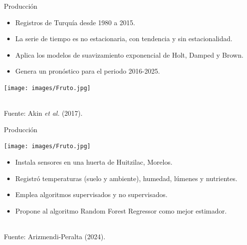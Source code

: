 \documentclass[aspectratio=169]{beamer}
\begin{document}
\begin{frame}{Producción}
    
    \vspace{-1cm}
		\begin{minipage}{0.5\textwidth}
            \begin{block}{}
                \begin{itemize}
				\item Registros de Turquía desde 1980 a 2015.
                    \item La serie de tiempo es no estacionaria, con tendencia y sin estacionalidad.
                    \item Aplica los modelos de suavizamiento exponencial de Holt, Damped y Brown.
                    \item Genera un pronóstico para el periodo 2016-2025. 
			\end{itemize}
            \end{block}
		\end{minipage}%
        \begin{minipage}{0.5\textwidth}
        \centering
\texttt{[image: images/Fruto.jpg]}
		\end{minipage}%
        \,\\
        \hfill {\scriptsize Fuente: Akin \textit{et al.} (2017).}
\end{frame}

\begin{frame}{Producción}
    \vspace{-1cm}
    \begin{minipage}{0.5\textwidth}
			\hspace{-0.5cm}
            \centering
            \texttt{[image: images/Fruto.jpg]}
		\end{minipage}%
		\begin{minipage}{0.5\textwidth}
            \begin{block}{}
                \begin{itemize}
                    \item Instala sensores en una huerta de Huitzilac, Morelos.
				\item Registró temperaturas (suelo y ambiente), humedad, lúmenes y nutrientes.
                    \item Emplea algoritmos supervisados y no supervisados. 
                    \item Propone al algoritmo Random Forest Regressor como mejor estimador.
			\end{itemize}
            \end{block}
		\end{minipage}
        \,\\
        \hfill {\scriptsize Fuente: Arizmendi-Peralta (2024).}
\end{frame}
\end{document}
